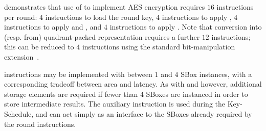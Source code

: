 demonstrates that use of 
to implement AES encryption requires
$16$ instructions per round:
$ 4$ 
     instructions to load the round key,
$ 4$ 
     instructions to apply ,
$ 4$ 
     instructions to apply  and ,
     and
$ 4$ 
     instructions to apply .
Note that conversion into (resp. from) quadrant-packed representation
requires a further
$12$ instructions;
     this can be reduced to
$ 4$ 
     instructions using the 
     standard 
     bit-manipulation
     extension~\cite[Section 17]{RV:ISA:I:19}.

 instructions may be implemented with between $1$ and $4$
SBox instances, with a corresponding tradeoff between area and
latency.
As with  and  however, additional storage elements
are required if fewer than $4$ SBoxes are instanced in order to
store intermediate results.
The auxiliary  instruction is used during the
Key-Schedule, and can act simply as an interface to the SBoxes
already required by the round instructions.


